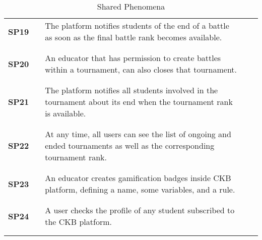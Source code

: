 \begin{longtable}[H]{l l p{8.5cm} l l}
    \textbf{SP19}  & \vline & The platform notifies students of the end of a battle as soon as the final battle rank becomes available.                         & \vline &                        \\
                   &        &                                                                                                                                   &        &                        \\\hline & & \\
    \textbf{SP20}  & \vline & An educator that has permission to create battles within a tournament, can also closes that tournament.                           & \vline &                        \\
                   &        &                                                                                                                                   &        &                        \\\hline & & \\
    \textbf{SP21}  & \vline & The platform notifies all students involved in the tournament about its end when the tournament rank is available.                & \vline &                        \\
                   &        &                                                                                                                                   &        &                        \\\hline & & \\
    \textbf{SP22}  & \vline & At any time, all users can see the list of ongoing and ended tournaments as well as the corresponding tournament rank.            & \vline &                        \\
                   &        &                                                                                                                                   &        &                        \\\hline & & \\
    \textbf{SP23}  & \vline & An educator creates gamification badges inside CKB platform, defining a name, some variables, and a rule.                         & \vline &                        \\
                   &        &                                                                                                                                   &        &                        \\\hline & & \\
    \textbf{SP24}  & \vline & A user checks the profile of any student subscribed to the CKB platform.                                                          & \vline &                        \\
                   &        &                                                                                                                                   &        &                        \\
    \hline                                                   
    \caption{Shared Phenomena}
\end{longtable}

